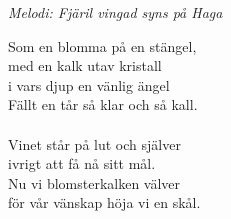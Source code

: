 {\footnotesize\textit{Melodi: Fjäril vingad syns på Haga}}\par
\vspace{10pt}
Som en blomma på en stängel,\\
med en kalk utav kristall\\
i vars djup en vänlig ängel\\
Fällt en tår så klar och så kall.\\
\\
Vinet står på lut och själver\\
ivrigt att få nå sitt mål.\\
Nu vi blomsterkalken välver\\
för vår vänskap höja vi en skål.
